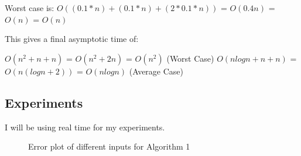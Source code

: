 \documentclass{article}
\begin{document}
Worst case is: $O((0.1*n) + (0.1*n) + (2*0.1*n))$ = $O(0.4n)$ = $O(n)$ = $O(n)$

This gives a final asymptotic time of:

$O(n^2 + n + n)$ = $O(n^2 +2n)$ =  $O(n^2)$ (Worst Case)
$O(nlogn + n + n)$ = $O(n(logn + 2))$ = $O(nlogn)$ (Average Case)

\newpage
\subsection{Experiments}
\label{sec:experiments1}

I will be using real time for my experiments.


 \begin{figure}
   \centering
  
   \caption{Error plot of different inputs for Algorithm 1}
   \label{fig:experiment1}
 \end{figure}
\end{document}
